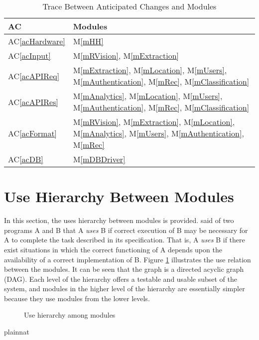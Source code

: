 \documentclass[12pt, titlepage]{article}
\newcommand{\acref}[1]{AC\ref{#1}}
\newcommand{\mref}[1]{M\ref{#1}}
\begin{document}
\begin{table}[H]
\centering
\begin{tabular}{p{} p{}}
\toprule
\textbf{AC} & \textbf{Modules}\\
\midrule
\acref{acHardware} & \mref{mHH}\\
\acref{acInput} & \mref{mRVision}, \mref{mExtraction}\\
\acref{acAPIReq} & \mref{mExtraction}, \mref{mLocation}, \mref{mUsers}, \mref{mAuthentication}, \mref{mRec}, \mref{mClassification}\\
\acref{acAPIRes} & \mref{mAnalytics}, \mref{mLocation}, \mref{mUsers}, \mref{mAuthentication}, \mref{mRec}, \mref{mClassification}\\
\acref{acFormat} & \mref{mRVision}, \mref{mExtraction}, \mref{mLocation}, \mref{mAnalytics}, \mref{mUsers}, \mref{mAuthentication}, \mref{mRec}\\
\acref{acDB} & \mref{mDBDriver}\\
\bottomrule
\end{tabular}
\caption{Trace Between Anticipated Changes and Modules}
\label{TblACT}
\end{table}

\section{Use Hierarchy Between Modules} \label{SecUse}

In this section, the uses hierarchy between modules is
provided. \citet{Parnas1978} said of two programs A and B that A {\em uses} B if
correct execution of B may be necessary for A to complete the task described in
its specification. That is, A {\em uses} B if there exist situations in which
the correct functioning of A depends upon the availability of a correct
implementation of B.  Figure \ref{FigUH} illustrates the use relation between
the modules. It can be seen that the graph is a directed acyclic graph
(DAG). Each level of the hierarchy offers a testable and usable subset of the
system, and modules in the higher level of the hierarchy are essentially simpler
because they use modules from the lower levels.

\begin{figure}[H]
\centering
\caption{Use hierarchy among modules}
\label{FigUH}
\end{figure}


 {plainnat}


\newpage{}
\end{document}
